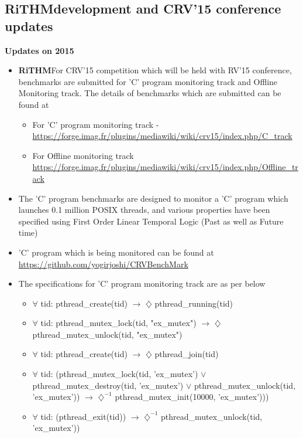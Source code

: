 \documentclass[]{article}
\newcommand{\rithm}{\textbf{RiTHM}\space}
\begin{document}
	\subsection{\rithm development and CRV'15 conference updates}
	\textbf{Updates on  {2015}}\newline
	\begin{itemize}

	\item
	\rithm For CRV'15 competition which will be held with RV'15 conference, benchmarks are submitted for 'C' program monitoring track and Offline Monitoring track.
	The details of benchmarks which are submitted can be found at 
	\begin{itemize}
		\item For 'C' program monitoring track - \url{https://forge.imag.fr/plugins/mediawiki/wiki/crv15/index.php/C_track}
		\item For Offline monitoring track \url{https://forge.imag.fr/plugins/mediawiki/wiki/crv15/index.php/Offline_track}
	\end{itemize}
	\item The 'C' program benchmarks are designed to monitor a 'C' program which launches 0.1 million POSIX threads, and various properties have been specified using First Order Linear Temporal Logic (Past as well as Future time)
	\item 'C' program which is being monitored can be found at \url{https://github.com/yogirjoshi/CRVBenchMark}
	\item The specifications for 'C' program monitoring track are as per below
	\begin{itemize}
		\item $\forall$ tid: pthread\_create(tid) $\longrightarrow$ $\diamondsuit$ pthread\_running(tid)
		\item $\forall$ tid: pthread\_mutex\_lock(tid, "ex\_mutex") $\longrightarrow$ $\diamondsuit$ pthread\_mutex\_unlock(tid, "ex\_mutex")
		\item $\forall$ tid: pthread\_create(tid) $\longrightarrow$ $\diamondsuit$ pthread\_join(tid)
		\item $\forall$ tid: (pthread\_mutex\_lock(tid, 'ex\_mutex') $\vee$ pthread\_mutex\_destroy(tid, 'ex\_mutex') $\vee$ pthread\_mutex\_unlock(tid, 'ex\_mutex')) $\longrightarrow$ $\diamondsuit^{-1}$ pthread\_mutex\_init(10000, 'ex\_mutex')))
		\item $\forall$ tid: (pthread\_exit(tid)) $\longrightarrow$ $\diamondsuit^{-1}$ pthread\_mutex\_unlock(tid, 'ex\_mutex'))

\end{itemize}
\end{itemize}
\end{document}
